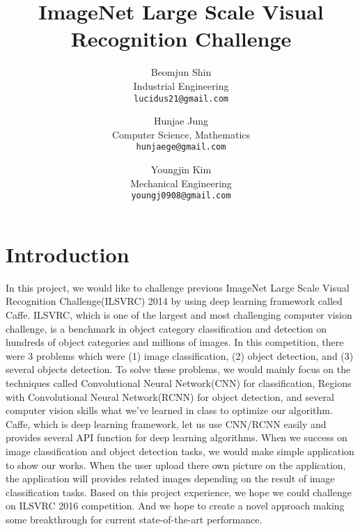 \documentclass[10pt,twocolumn,letterpaper]{article}
\begin{document}
\title{ImageNet Large Scale Visual Recognition Challenge}

\author{Beomjun Shin\\
Industrial Engineering\\
{\tt\small lucidus21@gmail.com}
\and
Hunjae Jung\\
Computer Science, Mathematics\\
{\tt\small hunjaege@gmail.com}
\and
Youngjin Kim\\
Mechanical Engineering\\
{\tt\small youngj0908@gmail.com}
}

\maketitle

\section{Introduction}

In this project, we would like to challenge previous ImageNet Large Scale Visual Recognition Challenge(ILSVRC) 2014 by using deep learning framework called Caffe.
ILSVRC, which is one of the largest and most challenging computer vision challenge, is a benchmark in object category classification and detection on hundreds of object categories and millions of images.
In this competition, there were 3 problems which were (1) image classification, (2) object detection, and (3) several objects detection.
To solve these problems, we would mainly focus on the techniques called Convolutional Neural Network(CNN) for classification, Regions with Convolutional Neural Network(RCNN) for object detection, and several computer vision skills what we've learned in class to optimize our algorithm.
Caffe, which is deep learning framework, let us use CNN/RCNN easily and provides several API function for deep learning algorithms.
When we success on image classification and object detection tasks, we would make simple application to show our works.
When the user upload there own picture on the application, the application will provides related images depending on the result of image classification tasks.
Based on this project experience, we hope we could challenge on ILSVRC 2016 competition.
And we hope to create a novel approach making some breakthrough for current state-of-the-art performance.

\end{document}
